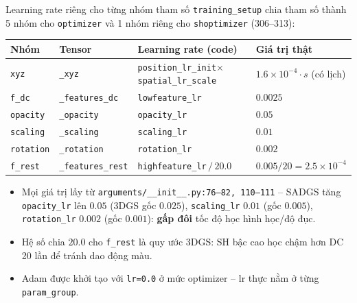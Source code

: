 \begin{frame}{Learning rate riêng cho từng nhóm tham số}
\scriptsize
\texttt{training\_setup} chia tham số thành 5 nhóm cho \texttt{optimizer} và 1 nhóm riêng cho \texttt{shoptimizer} (306--313):
\vspace{0.1cm}
\centering
\begin{tabular}{llll}
\toprule
\textbf{Nhóm} & \textbf{Tensor} & \textbf{Learning rate (code)} & \textbf{Giá trị thật} \\
\midrule
\texttt{xyz}      & \texttt{\_xyz}           & \texttt{position\_lr\_init}$\times$\texttt{spatial\_lr\_scale} & $1.6\times10^{-4}\cdot s$ (có lịch) \\
\texttt{f\_dc}    & \texttt{\_features\_dc}   & \texttt{lowfeature\_lr}   & $0.0025$ \\
\texttt{opacity}  & \texttt{\_opacity}        & \texttt{opacity\_lr}      & $0.05$ \\
\texttt{scaling}  & \texttt{\_scaling}        & \texttt{scaling\_lr}      & $0.01$ \\
\texttt{rotation} & \texttt{\_rotation}       & \texttt{rotation\_lr}     & $0.002$ \\
\midrule
\texttt{f\_rest}  & \texttt{\_features\_rest} & \texttt{highfeature\_lr}\,$/\,20.0$ & $0.005/20 = 2.5\times10^{-4}$ \\
\bottomrule
\end{tabular}
\vspace{0.2cm}
\flushleft
\begin{itemize}
    \item Mọi giá trị lấy từ \texttt{arguments/\_\_init\_\_.py:76--82, 110--111} -- SADGS tăng \texttt{opacity\_lr} lên $0.05$ (3DGS gốc $0.025$), \texttt{scaling\_lr} $0.01$ (gốc $0.005$), \texttt{rotation\_lr} $0.002$ (gốc $0.001$): \textbf{gấp đôi} tốc độ học hình học/độ đục.
    \item Hệ số chia $20.0$ cho \texttt{f\_rest} là quy ước 3DGS: SH bậc cao học chậm hơn DC 20 lần để tránh dao động màu.
    \item Adam được khởi tạo với \texttt{lr=0.0} ở mức optimizer -- lr thực nằm ở từng \texttt{param\_group}.
\end{itemize}
\end{frame}

